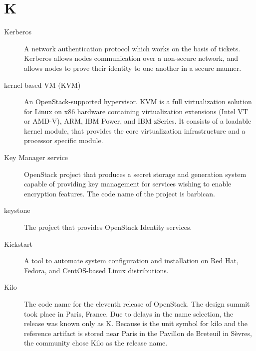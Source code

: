 \documentclass[letterpaper,10pt,english]{sphinxmanual}
\begin{document}
\section{K}
\label{_source/glossary:k}\begin{description}
\item[{Kerberos}] \leavevmode{}\label{_source/glossary:term-kerberos}
A network authentication protocol which works on the basis of
tickets. Kerberos allows nodes communication over a non-secure
network, and allows nodes to prove their identity to one another in a
secure manner.

\item[{kernel-based VM (KVM)}] \leavevmode{}\label{_source/glossary:term-kernel-based-vm-kvm}
An OpenStack-supported hypervisor. KVM is a full
virtualization solution for Linux on x86 hardware containing
virtualization extensions (Intel VT or AMD-V), ARM, IBM
Power, and IBM zSeries. It consists of a loadable kernel
module, that provides the core virtualization infrastructure
and a processor specific module.

\item[{Key Manager service}] \leavevmode{}\label{_source/glossary:term-key-manager-service}
OpenStack project that produces a secret storage and
generation system capable of providing key management for
services wishing to enable encryption features. The code name
of the project is barbican.

\item[{keystone}] \leavevmode{}\label{_source/glossary:term-keystone}
The project that provides OpenStack Identity services.

\item[{Kickstart}] \leavevmode{}\label{_source/glossary:term-kickstart}
A tool to automate system configuration and installation on Red
Hat, Fedora, and CentOS-based Linux distributions.

\item[{Kilo}] \leavevmode{}\label{_source/glossary:term-kilo}
The code name for the eleventh release of OpenStack. The
design summit took place in Paris, France. Due to delays in the name
selection, the release was known only as K. Because  is the
unit symbol for kilo and the reference artifact is stored near Paris
in the Pavillon de Breteuil in Sèvres, the community chose Kilo as
the release name.

\end{description}
\end{document}
